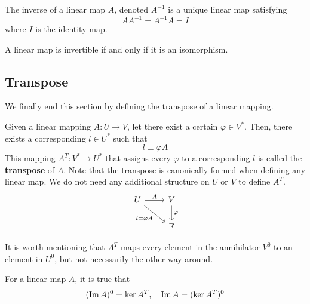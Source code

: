   \begin{definition}[Inverse]
    The inverse of a linear map $A$, denoted $A^{-1}$ is a unique linear map satisfying 
    \begin{equation}
      A A^{-1} = A^{-1} A = I
    \end{equation}
    where $I$ is the identity map. 
  \end{definition}

  \begin{corollary}
    A linear map is invertible if and only if it is an isomorphism. 
  \end{corollary}

\subsection{Transpose}

  We finally end this section by defining the transpose of a linear mapping. 

  \begin{definition}[Transpose]
    Given a linear mapping $A: U \longrightarrow V$, let there exist a certain $\varphi \in V^*$. Then, there exists a corresponding $l \in U^*$ such that 
    \begin{equation}
      l \equiv \varphi A
    \end{equation}
    This mapping $A^T: V^* \longrightarrow U^*$ that assigns every $\varphi$ to a corresponding $l$ is called the \textbf{transpose} of $A$. Note that the transpose is canonically formed when defining any linear map. We do not need any additional structure on $U$ or $V$ to define $A^T$.
    \[
      \begin{tikzcd}
        U \arrow{r}{A} \arrow[swap]{dr}{l = \varphi A} & V \arrow{d}{\varphi} \\
        & \mathbb{F}
      \end{tikzcd}
    \]
  \end{definition}

  It is worth mentioning that $A^T$ maps every element in the annihilator $V^0$ to an element in $U^0$, but not necessarily the other way around. 

  \begin{theorem}
    For a linear map $A$, it is true that
    \begin{equation}
      (\operatorname{Im} A)^0 = \ker A^T, \quad  \operatorname{Im} A = (\ker A^T)^0
    \end{equation}
  \end{theorem}

